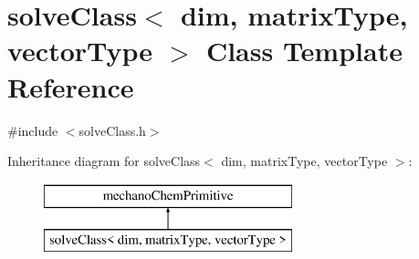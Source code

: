 \section{solve\-Class$<$ dim, matrix\-Type, vector\-Type $>$ Class Template Reference}
\label{classsolve_class}


{\ttfamily \#include $<$solve\-Class.\-h$>$}

Inheritance diagram for solve\-Class$<$ dim, matrix\-Type, vector\-Type $>$\-:\begin{figure}[H]
\begin{center}
\leavevmode
\includegraphics[height=2.000000cm]{classsolve_class}
\end{center}
\end{figure}
